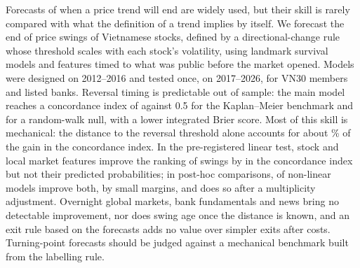 Forecasts of when a price trend will end are widely used, but their skill is rarely compared with
what the definition of a trend implies by itself. We forecast the end of price swings
of Vietnamese stocks, defined by a directional-change rule whose threshold scales with each stock's
volatility, using landmark survival models and features timed to what was public before the market
opened. Models were designed on 2012--2016 and tested once, on 2017--2026, for VN30 members and listed
banks. Reversal timing is predictable out of sample: the main model reaches a
concordance index of \CABCDx{} against 0.5 for the Kaplan--Meier benchmark and \CRW{} for a
random-walk null, with a lower integrated Brier score. Most of this skill is mechanical: the distance to the reversal
threshold alone accounts for about \MechShareDIST\% of the gain in the concordance index. In the pre-registered linear test,
stock and local market features improve the ranking of swings by \GainOverMFlex{} in the
concordance index but not their predicted probabilities; in post-hoc comparisons, \PHLikePass{} of
\PHLikeCount{} non-linear models improve both, by small margins, and \PHHolmPass{} does so after a
multiplicity adjustment. Overnight global markets, bank fundamentals and news bring
no detectable improvement, nor does swing age once the distance is known, and an exit rule based
on the forecasts adds no value over simpler exits after costs. Turning-point forecasts should be judged against a mechanical
benchmark built from the labelling rule.
